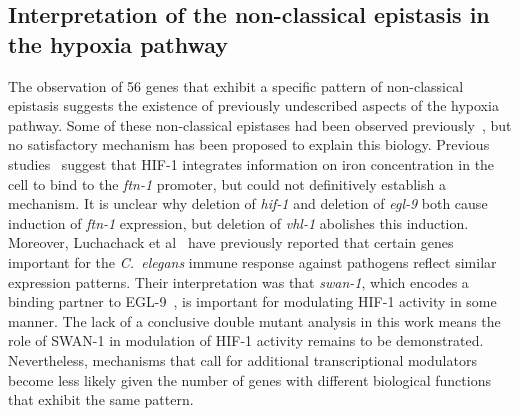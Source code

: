 \documentclass[10pt, onecolumn]{article}
\newcommand{\cel}{\emph{C.~elegans}}
\newcommand{\gene}[1]{\emph{#1}}
\newcommand{\ftna}{\emph{\mbox{ftn-1}}}
\newcommand{\eglp}{EGL-9}
\newcommand{\hifp}{HIF-1}
\newcommand{\hifohtargets}{56}
\begin{document}
%

\subsection*{Interpretation of the non-classical epistasis in the hypoxia pathway}
The observation of \hifohtargets{} genes that exhibit a specific pattern of
non-classical epistasis suggests the existence of previously undescribed aspects
of the hypoxia pathway. Some of these non-classical epistases had been observed
previously~\cite{Ackerman2012,Romney2011,Luhachack2012}, but
no satisfactory mechanism has been proposed to explain this biology.
Previous studies~\cite{Romney2011,Ackerman2012} suggest that \hifp{} integrates
information on iron concentration in the cell to bind to the \ftna{} promoter,
but could not definitively establish a mechanism.
It is unclear why deletion of \gene{hif-1} and deletion of \gene{egl-9} both
cause induction of \ftna{} expression,
but deletion of \gene{vhl-1} abolishes this induction. Moreover, Luchachack et
al~\cite{Luhachack2012} have previously reported that certain genes important
for the \cel{} immune response against pathogens reflect similar expression
patterns. Their interpretation was that \gene{swan-1}, which encodes a binding
partner to \eglp{}~\cite{Shao2010}, is important for modulating \hifp{} activity
in some manner. The lack of a conclusive double mutant analysis in this work
means the role of SWAN-1 in modulation of \hifp{} activity remains to be
demonstrated. Nevertheless, mechanisms that call for additional transcriptional
modulators become less likely given the number of genes with different biological
functions that exhibit the same pattern.
\end{document}
